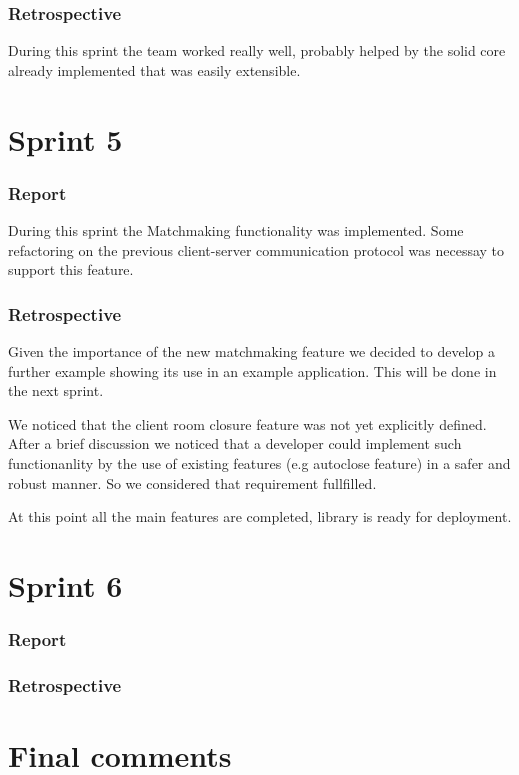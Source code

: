 \subsubsection{Retrospective}

During this sprint the team worked really well, probably helped by the solid core already implemented that was easily extensible.




\section{Sprint 5}

\subsubsection{Report}
During this sprint the Matchmaking functionality was implemented.
Some refactoring on the previous client-server communication protocol was necessay to support this feature.

\subsubsection{Retrospective}

Given the importance of the new matchmaking feature we decided to develop a further example showing its use in an example application. This will be done in the next sprint.

We noticed that the client room closure feature was not yet explicitly defined. 
After a brief discussion we noticed that a developer could implement such functionanlity by the use of existing features (e.g autoclose feature) in a safer and robust manner. So we considered that requirement fullfilled.

At this point all the main features are completed, library is ready for deployment.


\section{Sprint 6}

\subsubsection{Report}

\subsubsection{Retrospective}


\section{Final comments}